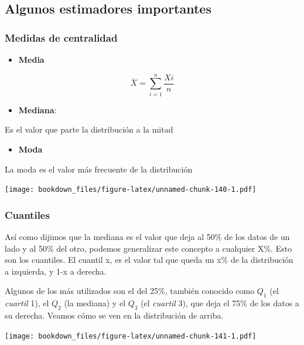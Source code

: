 \documentclass[]{book}
\providecommand{\tightlist}{%
  \setlength{\itemsep}{0pt}\setlength{\parskip}{0pt}}
\begin{document}
\hypertarget{algunos-estimadores-importantes}{%
\subsection{Algunos estimadores importantes}\label{algunos-estimadores-importantes}}

\hypertarget{medidas-de-centralidad}{%
\subsubsection{Medidas de centralidad}\label{medidas-de-centralidad}}

\begin{itemize}
\tightlist
\item
  \textbf{Media}
\end{itemize}

\[
\bar{X}= \sum_{i=1}^n \frac{Xi}{n}
\]

\begin{itemize}
\tightlist
\item
  \textbf{Mediana}:
\end{itemize}

Es el valor que parte la distribución a la mitad

\begin{itemize}
\tightlist
\item
  \textbf{Moda}
\end{itemize}

La moda es el valor más frecuente de la distribución

\texttt{[image: bookdown\_files/figure-latex/unnamed-chunk-140-1.pdf]}

\hypertarget{cuantiles}{%
\subsubsection{Cuantiles}\label{cuantiles}}

Así como dijimos que la mediana es el valor que deja al 50\% de los datos de un lado y al 50\% del otro, podemos generalizar este concepto a cualquier X\%. Esto son los cuantiles. El cuantil x, es el valor tal que queda un x\% de la distribución a izquierda, y 1-x a derecha.

Algunos de los más utilizados son el del 25\%, también conocido como \(Q_1\) (el \emph{cuartil} 1), el \(Q_2\) (la mediana) y el \(Q_3\) (el \emph{cuartil} 3), que deja el 75\% de los datos a su derecha. Veamos cómo se ven en la distribución de arriba.

\texttt{[image: bookdown\_files/figure-latex/unnamed-chunk-141-1.pdf]}
\end{document}
